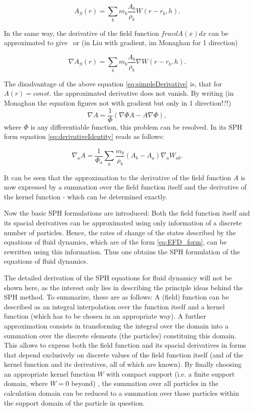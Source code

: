 \documentclass{report}
\begin{document}
\begin{equation}
\label{eq:intInter}
A_S(r)=\sum_b m_b \frac{A_b}{\rho_b}W(r-r_b,h).
\end{equation}


In the same way, the derivative of the field function $frac{dA(x)}{dx}$ can be
approximated to give~\cite{Monaghan2005} or \cite{Liu2003} (in Liu with gradient,
im Monaghan for 1 direction)

\begin{equation}
\label{eq:simpleDerivative}
\nabla A_S(r)=\sum_b m_b \frac{A_b}{\rho_b}\nabla W(r-r_b,h).
\end{equation}

The disadvantage of the above equation \ref{eq:simpleDerivative} is, that for
$A(r)=const.$ the approximated derivative does not vanish. By writing (in
Monaghan the equation figures not with gradient but only in 1 direction!?!)
\begin{equation}
\label{eq:derivativeIdentity}
\nabla A = \frac{1}{\Phi}(\nabla {\Phi A}-A\nabla \Phi),
\end{equation}
where $\Phi$ is any differentiable function, this problem can be resolved. In its
SPH form  equation \ref{eq:derivativeIdentity} reads as follows:

\begin{equation}
\nabla_a A = \frac{1}{\Phi_a}\sum_b \frac{m_b}{\rho_b}(A_b-A_a)\nabla_a W_{ab}.
\end{equation}

It can be seen that the approximation to the derivative of the
field function $A$ is now expressed by a summation over the field function itself
and the derivative of the kernel function - which can be determined exactly.

Now the basic SPH formulations are introduced: Both the field function
itself and its spacial derivatives can be approximated using only information 
of a discrete number of particles. Hence, the rates of change of
the states described by the equations of fluid dynamics, which are of the form
\ref{eq:EFD_form}, can be rewritten using this information. Thus 
one obtains the SPH formulation of the equations of fluid dynamics.

The detailed derivation of the SPH equations for fluid dynamicy will not be shown here, as the
interest  only lies in describing the principle ideas behind the SPH
method. To summarize, these are as follows: A (field) function can be
described as an integral interpolation over the function itself and a kernel
function (which has to be chosen in an appropriate way). A further
approximation consists in transforming the integral over the domain into a
summation over the discrete elements (the particles) constituing this domain. 
This allows to express both
the field function and its spacial derivatives in forms 
that depend exclusively on discrete values
of the field function itself (and of the kernel function and its derivatives, 
all of which are known). By finally choosing an appropriate kernel function $W$ with
compact support (i.e. a finite support domain, where $W=0$ beyond) , the summation over all particles in the calculation domain can be reduced
to a summation over those particles within the support domain of the particle
in question.
\end{document}
